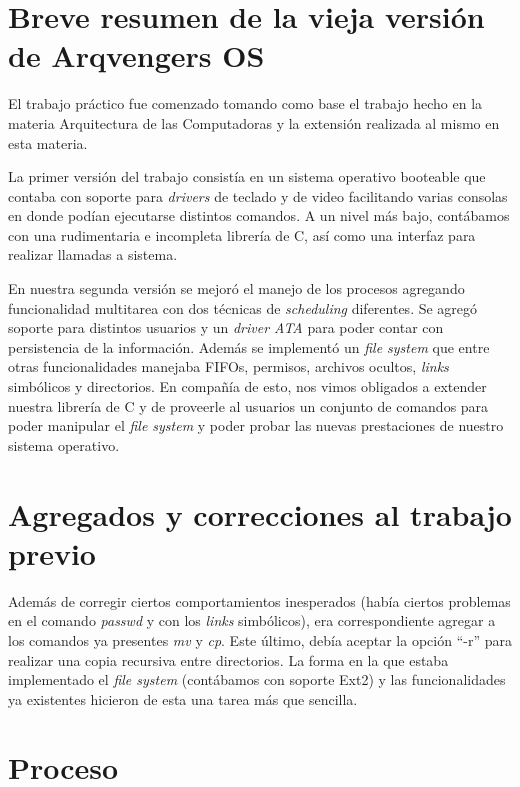 \documentclass[a4paper,10pt]{article}
\begin{document}
\newpage
\section{Breve resumen de la vieja versión de Arqvengers OS}
El trabajo práctico fue comenzado tomando como base el trabajo hecho en la materia Arquitectura de las Computadoras y la extensión 
realizada al mismo en esta materia.

La primer versión del trabajo consistía en un sistema operativo booteable que contaba con soporte para \textit{drivers} de
 teclado y de video facilitando varias consolas en donde podían ejecutarse distintos comandos. 
A un nivel más bajo, contábamos con una rudimentaria e incompleta librería de C, así como una interfaz para realizar 
llamadas a sistema.

En nuestra segunda versión se mejoró el manejo de los procesos agregando funcionalidad multitarea con dos técnicas de 
\textit{scheduling} diferentes. Se agregó soporte para distintos usuarios y un \textit{driver ATA} para poder contar con persistencia 
de la información. Además se implementó un \textit{file system} que entre otras funcionalidades manejaba FIFOs, permisos, 
archivos ocultos, \textit{links} simbólicos y directorios. En compañía de esto, nos vimos obligados a extender nuestra librería de 
C y de proveerle al usuarios un conjunto de comandos para poder manipular el \textit{file system} y poder probar las nuevas 
prestaciones de nuestro sistema operativo.

\newpage

\section{Agregados y correcciones al trabajo previo}

Además de corregir ciertos comportamientos inesperados (había ciertos problemas en el comando \textit{passwd} y con los
\textit{links} simbólicos), era correspondiente agregar a los comandos ya presentes \textit{mv} y \textit{cp}. Este último, 
debía aceptar la opción ``-r'' para realizar una copia recursiva entre directorios. La forma en la que estaba implementado 
el \textit{file system} (contábamos con soporte Ext2) y las funcionalidades ya existentes hicieron de esta una tarea más que sencilla.

\newpage

\section{Proceso}
\end{document}
